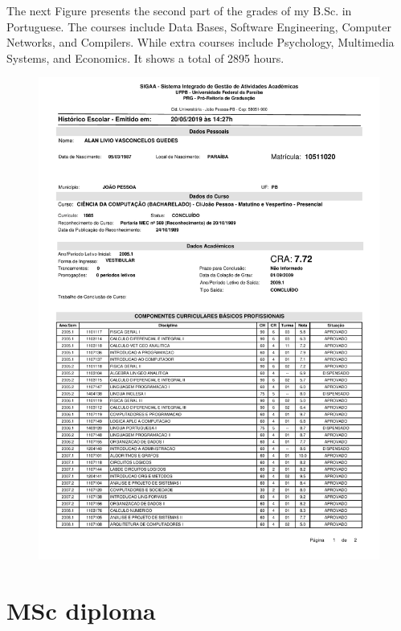 \documentclass[10pt,a4paper,sans,colorlinks]{moderncv}
\begin{document}
The next Figure presents the second part of the grades of my B.Sc. in Portuguese.
The courses include Data Bases, Software Engineering, Computer Networks, and Compilers.
While extra courses include Psychology, Multimedia Systems, and Economics.
It shows a total of 2895 hours.
\vspace{2em}
\begin{figure}
    \centering
    \includegraphics[align=t,width=\textwidth,height=0.75\textheight, keepaspectratio=true,page=2, trim=0cm 0cm 0cm 2cm]{certificates/bsc-grades.pdf}
\end{figure}

\newpage

\section{MSc diploma}
\end{document}
